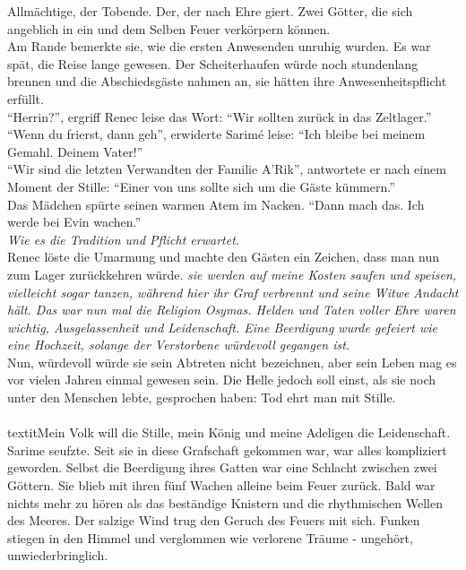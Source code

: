 Allmächtige, der Tobende. Der, der nach Ehre giert. Zwei Götter, die sich angeblich in ein und dem 
Selben Feuer verkörpern können.\\
Am Rande bemerkte sie, wie die ersten Anwesenden unruhig wurden. Es war spät, die Reise lange 
gewesen. Der Scheiterhaufen würde noch stundenlang brennen und die Abschiedsgäste nahmen an, sie 
hätten ihre Anwesenheitspflicht erfüllt. \\
``Herrin?'', ergriff Renec leise das Wort: ``Wir sollten zurück in das Zeltlager.''\\
``Wenn du frierst, dann geh'', erwiderte Sarimé leise: ``Ich bleibe bei meinem Gemahl. Deinem 
Vater!''\\
``Wir sind die letzten Verwandten der Familie A'Rik'', antwortete er nach einem Moment der Stille: 
``Einer von uns sollte sich um die Gäste kümmern.''\\
Das Mädchen spürte seinen warmen Atem im Nacken. ``Dann mach das. Ich werde bei Evin wachen.''\\
\textit{Wie es die Tradition und Pflicht erwartet.}\\
Renec löste die Umarmung und machte den Gästen ein Zeichen, dass man nun zum Lager zurückkehren 
würde. \textit{sie werden auf meine Kosten saufen und speisen, vielleicht sogar tanzen, während hier 
ihr Graf verbrennt und seine Witwe Andacht hält. Das war nun mal die Religion Osymas. Helden und 
Taten voller Ehre waren wichtig, Ausgelassenheit und Leidenschaft. Eine Beerdigung wurde gefeiert 
wie eine Hochzeit, solange der Verstorbene würdevoll gegangen ist.}\\
Nun, würdevoll würde sie sein Abtreten nicht bezeichnen, aber sein Leben mag es vor vielen Jahren 
einmal gewesen sein. Die Helle jedoch soll einst, als sie noch unter den Menschen lebte, gesprochen 
haben: Tod ehrt man mit Stille.\\
\\textit{Mein Volk will die Stille, mein König und meine Adeligen die Leidenschaft.}\\
Sarime seufzte. Seit sie in diese Grafschaft gekommen war, war alles kompliziert geworden. Selbst 
die Beerdigung ihres Gatten war eine Schlacht zwischen zwei Göttern. Sie blieb mit ihren fünf 
Wachen alleine beim Feuer zurück. Bald war nichts mehr zu hören als das beständige Knistern und die 
rhythmischen Wellen des Meeres. Der salzige Wind trug den Geruch des Feuers mit sich. Funken 
stiegen in den Himmel und verglommen wie verlorene Träume - ungehört, unwiederbringlich. \\

